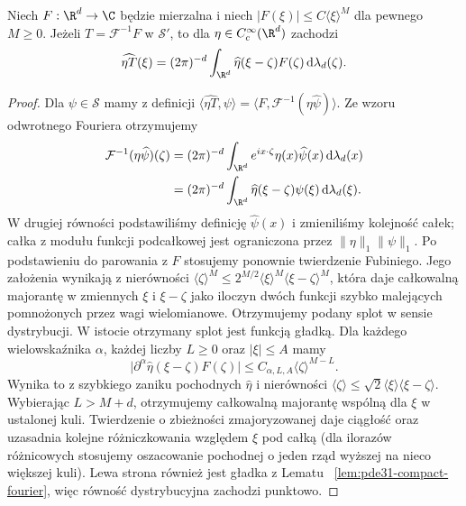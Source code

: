 \begin{lemat}
\label{lem:pde31-polynomial-convolution}
Niech $F:\R^d\to\C$ będzie mierzalna i niech
$|F(\xi)|\le C\langle\xi\rangle^M$ dla pewnego $M\ge0$.
Jeżeli $T=\mathcal F^{-1}F$ w $\mathcal S'$,
to dla $\eta\in C_c^\infty(\R^d)$ zachodzi
\[
 \widehat{\eta T}(\xi)=(2\pi)^{-d}
 \int_{\R^d}\widehat\eta(\xi-\zeta)F(\zeta)
 \,\mathrm d\lambda_d(\zeta).
\]
\end{lemat}
\begin{proof}
Dla $\psi\in\mathcal S$ mamy z definicji
$\langle\widehat{\eta T},\psi\rangle
=\langle F,\mathcal F^{-1}(\eta\widehat\psi)\rangle$.
Ze wzoru odwrotnego Fouriera otrzymujemy
\[
 \begin{aligned}
 \mathcal F^{-1}(\eta\widehat\psi)(\zeta)
 &= (2\pi)^{-d}\int_{\R^d}
 e^{ix\cdot\zeta}\eta(x)\widehat\psi(x)
 \,\mathrm d\lambda_d(x)\\
 &= (2\pi)^{-d}\int_{\R^d}
 \widehat\eta(\xi-\zeta)\psi(\xi)\,\mathrm d\lambda_d(\xi).
 \end{aligned}
\]
W drugiej równości podstawiliśmy definicję
$\widehat\psi(x)$ i zmieniliśmy kolejność całek;
całka z modułu funkcji podcałkowej jest
ograniczona przez $\|\eta\|_1\|\psi\|_1$.
Po podstawieniu do parowania z $F$ stosujemy
ponownie twierdzenie Fubiniego. Jego założenia
wynikają z nierówności
$\langle\zeta\rangle^M\le
2^{M/2}\langle\xi\rangle^M\langle\xi-\zeta\rangle^M$,
która daje całkowalną majorantę w zmiennych
$\xi$ i $\xi-\zeta$ jako iloczyn dwóch funkcji
szybko malejących pomnożonych przez wagi wielomianowe.
Otrzymujemy podany splot w sensie dystrybucji.
W istocie otrzymany splot jest funkcją gładką.
Dla każdego wielowskaźnika $\alpha$, każdej
liczby $L\ge0$ oraz $|\xi|\le A$ mamy
\[
 \bigl|\partial^\alpha\widehat\eta(\xi-\zeta)F(\zeta)\bigr|
 \le C_{\alpha,L,A}\langle\zeta\rangle^{M-L}.
\]
Wynika to z szybkiego zaniku pochodnych
$\widehat\eta$ i nierówności
$\langle\zeta\rangle\le\sqrt{2}\langle\xi\rangle
\langle\xi-\zeta\rangle$.
Wybierając $L>M+d$, otrzymujemy całkowalną
majorantę wspólną dla $\xi$ w ustalonej kuli.
Twierdzenie o zbieżności zmajoryzowanej daje
ciągłość oraz uzasadnia kolejne różniczkowania
względem $\xi$ pod całką (dla ilorazów różnicowych
stosujemy oszacowanie pochodnej o jeden rząd wyższej
na nieco większej kuli).
Lewa strona również jest gładka z Lematu
~\ref{lem:pde31-compact-fourier}, więc równość
dystrybucyjna zachodzi punktowo.
\end{proof}

